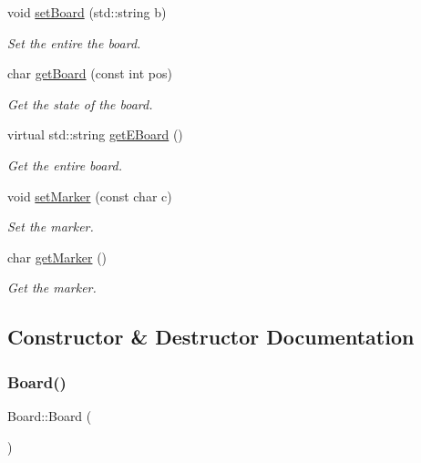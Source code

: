 \begin{DoxyCompactItemize}
void \mbox{\hyperlink{classBoard_a47d1cea73ebf03e59b09d1134348c377}{set\+Board}} (std\+::string b)
\begin{DoxyCompactList}\small\item\em Set the entire the board. \end{DoxyCompactList}\item 
char \mbox{\hyperlink{classBoard_af7e9c87bb428473eb051ca19ee36ca95}{get\+Board}} (const int pos)
\begin{DoxyCompactList}\small\item\em Get the state of the board. \end{DoxyCompactList}\item 
virtual std\+::string \mbox{\hyperlink{classBoard_a3707ab499357d887c1be4e2bbb477891}{get\+E\+Board}} ()
\begin{DoxyCompactList}\small\item\em Get the entire board. \end{DoxyCompactList}\item 
void \mbox{\hyperlink{classBoard_add8b23c5ba550963a8e1641b6df26fa9}{set\+Marker}} (const char c)
\begin{DoxyCompactList}\small\item\em Set the marker. \end{DoxyCompactList}\item 
char \mbox{\hyperlink{classBoard_a735a4eec8098cf419441ebb7e4b4fa16}{get\+Marker}} ()
\begin{DoxyCompactList}\small\item\em Get the marker. \end{DoxyCompactList}\end{DoxyCompactItemize}


\subsection{Constructor \& Destructor Documentation}
\mbox{\label{classBoard_a9ee491d4fea680cf69b033374a9fdfcb}} 
\subsubsection{\texorpdfstring{Board()}{Board()}}
{\footnotesize\ttfamily Board\+::\+Board (\begin{DoxyParamCaption}{ }\end{DoxyParamCaption})\hspace{0.3cm}{\ttfamily [inline]}}



